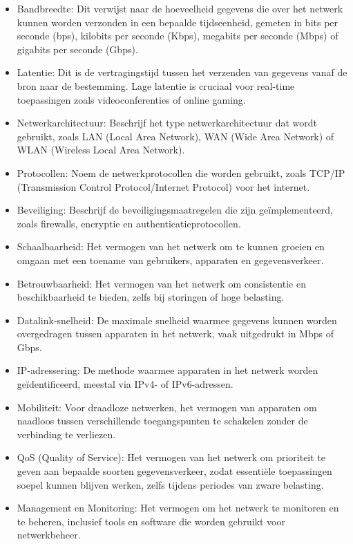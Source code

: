 \begin{itemize}
    \item Bandbreedte: Dit verwijst naar de hoeveelheid gegevens die over het netwerk kunnen worden verzonden in een bepaalde tijdseenheid, gemeten in bits per seconde (bps), kilobits per seconde (Kbps), megabits per seconde (Mbps) of gigabits per seconde (Gbps). \cite{Bandbreedte}
    \item Latentie: Dit is de vertragingstijd tussen het verzenden van gegevens vanaf de bron naar de bestemming. Lage latentie is cruciaal voor real-time toepassingen zoals videoconferenties of online gaming.
    \item Netwerkarchitectuur: Beschrijf het type netwerkarchitectuur dat wordt gebruikt, zoals LAN (Local Area Network), WAN (Wide Area Network) of WLAN (Wireless Local Area Network).
    \item Protocollen: Noem de netwerkprotocollen die worden gebruikt, zoals TCP/IP (Transmission Control Protocol/Internet Protocol) voor het internet.
    \item Beveiliging: Beschrijf de beveiligingsmaatregelen die zijn geïmplementeerd, zoals firewalls, encryptie en authenticatieprotocollen.
    \item Schaalbaarheid: Het vermogen van het netwerk om te kunnen groeien en omgaan met een toename van gebruikers, apparaten en gegevensverkeer.
    \item Betrouwbaarheid: Het vermogen van het netwerk om consistentie en beschikbaarheid te bieden, zelfs bij storingen of hoge belasting.
    \item Datalink-snelheid: De maximale snelheid waarmee gegevens kunnen worden overgedragen tussen apparaten in het netwerk, vaak uitgedrukt in Mbps of Gbps.
    \item IP-adressering: De methode waarmee apparaten in het netwerk worden geïdentificeerd, meestal via IPv4- of IPv6-adressen.
    \item Mobiliteit: Voor draadloze netwerken, het vermogen van apparaten om naadloos tussen verschillende toegangspunten te schakelen zonder de verbinding te verliezen.
    \item QoS (Quality of Service): Het vermogen van het netwerk om prioriteit te geven aan bepaalde soorten gegevensverkeer, zodat essentiële toepassingen soepel kunnen blijven werken, zelfs tijdens periodes van zware belasting.
    \item Management en Monitoring: Het vermogen om het netwerk te monitoren en te beheren, inclusief tools en software die worden gebruikt voor netwerkbeheer.

\end{itemize}
